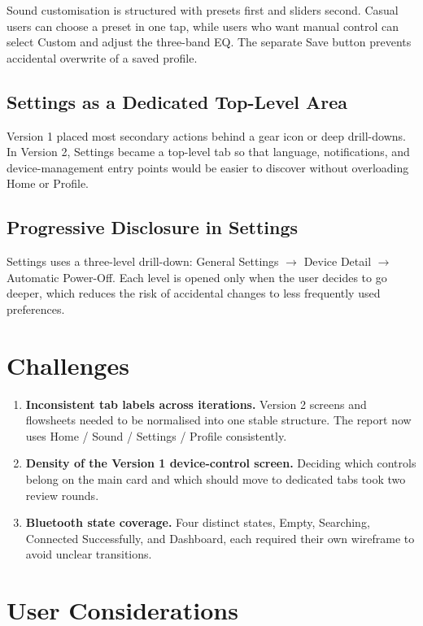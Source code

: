\documentclass[12pt, a4paper]{report}
\begin{document}
Sound customisation is structured with presets first and sliders second. Casual
users can choose a preset in one tap, while users who want manual control can
select Custom and adjust the three-band EQ. The separate Save button prevents
accidental overwrite of a saved profile.

\subsection{Settings as a Dedicated Top-Level Area}

Version 1 placed most secondary actions behind a gear icon or deep drill-downs.
In Version 2, Settings became a top-level tab so that language, notifications, and
device-management entry points would be easier to discover without overloading Home
or Profile.

\subsection{Progressive Disclosure in Settings}

Settings uses a three-level drill-down:
General Settings $\to$ Device Detail $\to$ Automatic Power-Off.
Each level is opened only when the user decides to go deeper, which reduces the risk
of accidental changes to less frequently used preferences.

\section{Challenges}

\begin{enumerate}
  \item \textbf{Inconsistent tab labels across iterations.} Version 2 screens and
    flowsheets needed to be normalised into one stable structure. The report now
    uses Home / Sound / Settings / Profile consistently.
  \item \textbf{Density of the Version 1 device-control screen.} Deciding which
    controls belong on the main card and which should move to dedicated tabs took
    two review rounds.
  \item \textbf{Bluetooth state coverage.} Four distinct states, Empty, Searching,
    Connected Successfully, and Dashboard, each required their own wireframe to
    avoid unclear transitions.
\end{enumerate}

\section{User Considerations}
\end{document}

